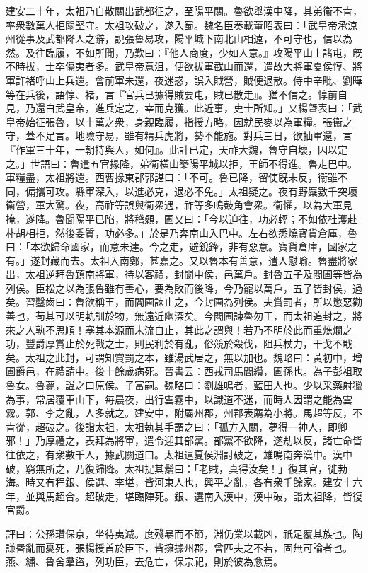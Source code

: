 \begin{pinyinscope}
建安二十年，太祖乃自散關出武都征之，至陽平關。魯欲舉漢中降，其弟衞不肯，率衆數萬人拒關堅守。太祖攻破之，遂入蜀。魏名臣奏載董昭表曰：「武皇帝承涼州從事及武都降人之辭，說張魯易攻，陽平城下南北山相遠，不可守也，信以為然。及往臨履，不如所聞，乃歎曰：『他人商度，少如人意。』攻陽平山上諸屯，旣不時拔，士卒傷夷者多。武皇帝意沮，便欲拔軍截山而還，遣故大將軍夏侯惇、將軍許褚呼山上兵還。會前軍未還，夜迷惑，誤入賊營，賊便退散。侍中辛毗、劉曄等在兵後，語惇、褚，言『官兵已據得賊要屯，賊已散走』。猶不信之。惇前自見，乃還白武皇帝，進兵定之，幸而克獲。此近事，吏士所知。」又楊曁表曰：「武皇帝始征張魯，以十萬之衆，身親臨履，指授方略，因就民麥以為軍糧。張衞之守，蓋不足言。地險守易，雖有精兵虎將，勢不能施。對兵三日，欲抽軍還，言『作軍三十年，一朝持與人，如何』。此計已定，天祚大魏，魯守自壞，因以定之。」世語曰：魯遣五官掾降，弟衞橫山築陽平城以拒，王師不得進。魯走巴中。軍糧盡，太祖將還。西曹掾東郡郭諶曰：「不可。魯已降，留使旣未反，衞雖不同，偏攜可攻。縣軍深入，以進必克，退必不免。」太祖疑之。夜有野麋數千突壞衞營，軍大驚。夜，高祚等誤與衞衆遇，祚等多鳴鼓角會衆。衞懼，以為大軍見掩，遂降。魯聞陽平已陷，將稽顙，圃又曰：「今以迫往，功必輕；不如依杜濩赴朴胡相拒，然後委質，功必多。」於是乃奔南山入巴中。左右欲悉燒寶貨倉庫，魯曰：「本欲歸命國家，而意未達。今之走，避銳鋒，非有惡意。寶貨倉庫，國家之有。」遂封藏而去。太祖入南鄭，甚嘉之。又以魯本有善意，遣人慰喻。魯盡將家出，太祖逆拜魯鎮南將軍，待以客禮，封閬中侯，邑萬戶。封魯五子及閻圃等皆為列侯。臣松之以為張魯雖有善心，要為敗而後降，今乃寵以萬戶，五子皆封侯，過矣。習鑿齒曰：魯欲稱王，而閻圃諫止之，今封圃為列侯。夫賞罰者，所以懲惡勸善也，苟其可以明軌訓於物，無遠近幽深矣。今閻圃諫魯勿王，而太祖追封之，將來之人孰不思順！塞其本源而末流自止，其此之謂與！若乃不明於此而重燋爛之功，豐爵厚賞止於死戰之士，則民利於有亂，俗競於殺伐，阻兵杖力，干戈不戢矣。太祖之此封，可謂知賞罰之本，雖湯武居之，無以加也。魏略曰：黃初中，增圃爵邑，在禮請中。後十餘歲病死。晉書云：西戎司馬閻纘，圃孫也。為子彭祖取魯女。魯薨，諡之曰原侯。子富嗣。魏略曰：劉雄鳴者，藍田人也。少以采藥射獵為事，常居覆車山下，每晨夜，出行雲霧中，以識道不迷，而時人因謂之能為雲霧。郭、李之亂，人多就之。建安中，附屬州郡，州郡表薦為小將。馬超等反，不肯從，超破之。後詣太祖，太祖執其手謂之曰：「孤方入關，夢得一神人，即卿邪！」乃厚禮之，表拜為將軍，遣令迎其部黨。部黨不欲降，遂劫以反，諸亡命皆往依之，有衆數千人，據武關道口。太祖遣夏侯淵討破之，雄鳴南奔漢中。漢中破，窮無所之，乃復歸降。太祖捉其鬚曰：「老賊，真得汝矣！」復其官，徙勃海。時又有程銀、侯選、李堪，皆河東人也，興平之亂，各有衆千餘家。建安十六年，並與馬超合。超破走，堪臨陣死。銀、選南入漢中，漢中破，詣太祖降，皆復官爵。

評曰：公孫瓚保京，坐待夷滅。度殘暴而不節，淵仍業以載凶，祇足覆其族也。陶謙昬亂而憂死，張楊授首於臣下，皆擁據州郡，曾匹夫之不若，固無可論者也。燕、繡、魯舍羣盜，列功臣，去危亡，保宗祀，則於彼為愈焉。


\end{pinyinscope}